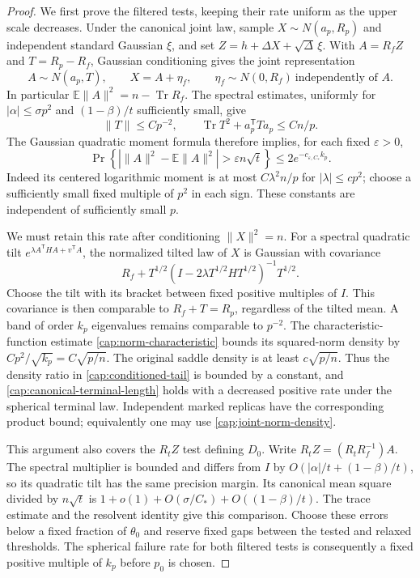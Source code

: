 \begin{proof}
We first prove the filtered tests, keeping their rate uniform as the upper
scale decreases. Under the canonical joint law, sample
$X\sim N(a_p,R_p)$ and independent standard Gaussian $\xi$, and set
$Z=h+\Delta X+\sqrt\Delta\,\xi$. With $A=R_fZ$ and $T=R_p-R_f$,
Gaussian conditioning gives the joint representation
\begin{equation}\label{cap:terminal-joint-gaussian}
 A\sim N(a_p,T),\qquad X=A+\eta_f,\qquad
 \eta_f\sim N(0,R_f)\ \text{independently of }A.
\end{equation}
In particular $\mathbb E\|A\|^2=n-\operatorname{Tr}R_f$. The spectral
estimates, uniformly for $|\alpha|\le\sigma p^2$ and
$(1-\beta)/t$ sufficiently small, give
\[
 \|T\|\le Cp^{-2},\qquad
 \operatorname{Tr}T^2+a_p^{\mathsf T}Ta_p\le Cn/p.
\]
The Gaussian quadratic moment formula therefore implies, for each fixed
$\varepsilon>0$,
\begin{equation}\label{cap:canonical-terminal-length}
 \Pr\!\left\{\left|\|A\|^2-\mathbb E\|A\|^2\right|
             >\varepsilon n\sqrt t\right\}
 \le 2e^{-c_{\varepsilon,C_*}k_p}.
\end{equation}
Indeed its centered logarithmic moment is at most
$C\lambda^2 n/p$ for $|\lambda|\le cp^2$; choose a sufficiently small
fixed multiple of $p^2$ in each sign. These constants are independent of
sufficiently small $p$.

We must retain this rate after conditioning $\|X\|^2=n$. For a spectral
quadratic tilt $e^{\lambda A^{\mathsf T}HA+v^{\mathsf T}A}$, the normalized
tilted law of $X$ is Gaussian with covariance
\[
 R_f+T^{1/2}
   (I-2\lambda T^{1/2}HT^{1/2})^{-1}T^{1/2}.
\]
Choose the tilt with its bracket between fixed positive multiples of $I$.
This covariance is then comparable to $R_f+T=R_p$, regardless of the
tilted mean. A band of order $k_p$ eigenvalues remains comparable to
$p^{-2}$. The characteristic-function estimate
\eqref{cap:norm-characteristic} bounds its squared-norm density by
$Cp^2/\sqrt{k_p}=C\sqrt{p/n}$. The original saddle density is at least
$c\sqrt{p/n}$. Thus the density ratio in
\eqref{cap:conditioned-tail} is bounded by a constant, and
\eqref{cap:canonical-terminal-length} holds with a decreased positive
rate under the spherical terminal law. Independent marked replicas have
the corresponding product bound; equivalently one may use
\eqref{cap:joint-norm-density}.

This argument also covers the $R_tZ$ test defining $D_0$. Write
$R_tZ=(R_tR_f^{-1})A$. The spectral multiplier is bounded and differs
from $I$ by $O(|\alpha|/t+(1-\beta)/t)$, so its quadratic tilt has the same
precision margin. Its canonical mean square divided by $n\sqrt t$ is
$1+o(1)+O(\sigma/C_*)+O((1-\beta)/t)$. The trace estimate and the
resolvent identity give this comparison. Choose these errors below a
fixed fraction of $\theta_0$ and reserve fixed gaps between the tested
and relaxed thresholds. The spherical failure rate for both filtered
tests is consequently a fixed positive multiple of $k_p$ before $p_0$
is chosen.


\end{proof}
